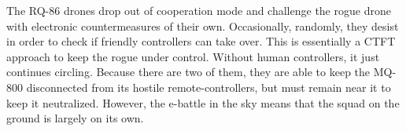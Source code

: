 %
%
%

The RQ-86 drones drop out of cooperation mode and challenge the rogue drone with electronic countermeasures of their own.
Occasionally, randomly, they desist in order to check if friendly controllers can take over.
This is essentially a CTFT approach to keep the rogue under control.
Without human controllers, it just continues circling.
Because there are two of them, they are able to keep the MQ-800 disconnected from its hostile remote-controllers, but must remain near it to keep it neutralized.
However, the e-battle in the sky means that the squad on the ground is largely on its own.